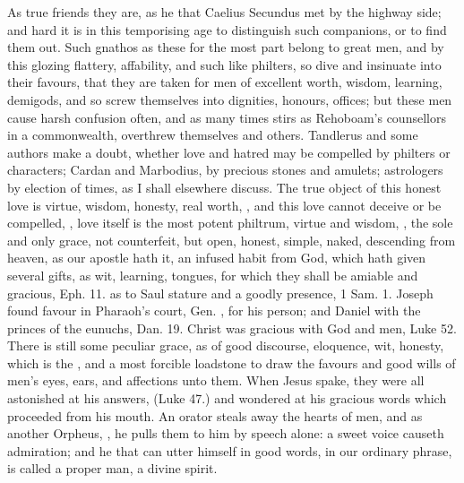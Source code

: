 {As true friends they are, as he that Caelius Secundus met by the
highway side; and hard it is in this temporising age to distinguish
such companions, or to find them out. Such gnathos as these for the
most part belong to great men, and by this glozing flattery,
affability, and such like philters, so dive and insinuate into their
favours, that they are taken for men of excellent worth, wisdom,
learning, demigods, and so screw themselves into dignities, honours,
offices; but these men cause harsh confusion often, and as many times
stirs as Rehoboam's counsellors in a commonwealth, overthrew themselves
and others. Tandlerus and some authors make a doubt, whether love and
hatred may be compelled by philters or characters; Cardan and
Marbodius, by precious stones and amulets; astrologers by election of
times, \etc{} as I shall elsewhere discuss. The true object of this
honest love is virtue, wisdom, honesty, real worth, , and this love cannot deceive or be compelled, , love itself is the most potent philtrum, virtue and wisdom,
, the sole and only grace, not counterfeit, but
open, honest, simple, naked, descending from heaven, as our
apostle hath it, an infused habit from God, which hath given several
gifts, as wit, learning, tongues, for which they shall be amiable and
gracious, Eph.  11. as to Saul stature and a goodly presence, 1 Sam.
 1. Joseph found favour in Pharaoh's court, Gen. , for
his person; and Daniel with the princes of the eunuchs, Dan. 
19. Christ was gracious with God and men, Luke  52. There is still
some peculiar grace, as of good discourse, eloquence, wit, honesty,
which is the , and a most forcible loadstone
to draw the favours and good wills of men's eyes, ears, and affections
unto them. When Jesus spake, they were all astonished at his answers,
(Luke  47.) and wondered at his gracious words which proceeded from
his mouth. An orator steals away the hearts of men, and as another
Orpheus, , he pulls them to him by speech alone: a
sweet voice causeth admiration; and he that can utter himself in good
words, in our ordinary phrase, is called a proper man, a divine spirit.

}
